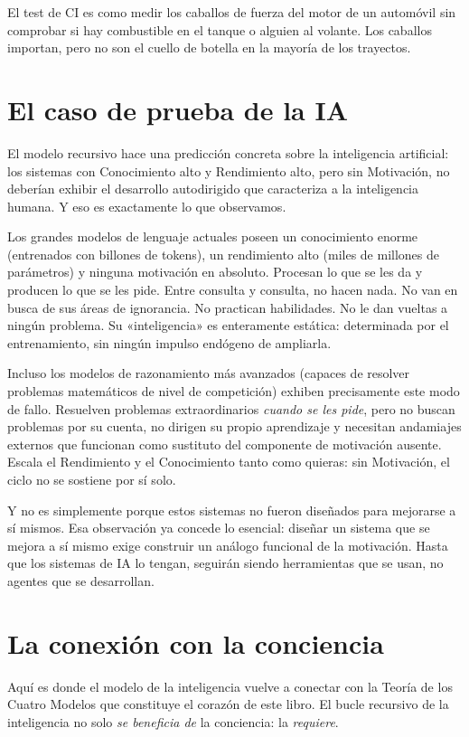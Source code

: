 \documentclass[11pt, twoside, openright]{book}
\begin{document}
El test de CI es como medir los caballos de fuerza del motor de un automóvil sin comprobar si hay combustible en el tanque o alguien al volante. Los caballos importan, pero no son el cuello de botella en la mayoría de los trayectos.

\section*{El caso de prueba de la IA}

El modelo recursivo hace una predicción concreta sobre la inteligencia artificial: los sistemas con Conocimiento alto y Rendimiento alto, pero sin Motivación, no deberían exhibir el desarrollo autodirigido que caracteriza a la inteligencia humana. Y eso es exactamente lo que observamos.

Los grandes modelos de lenguaje actuales poseen un conocimiento enorme (entrenados con billones de tokens), un rendimiento alto (miles de millones de parámetros) y ninguna motivación en absoluto. Procesan lo que se les da y producen lo que se les pide. Entre consulta y consulta, no hacen nada. No van en busca de sus áreas de ignorancia. No practican habilidades. No le dan vueltas a ningún problema. Su «inteligencia» es enteramente estática: determinada por el entrenamiento, sin ningún impulso endógeno de ampliarla.

Incluso los modelos de razonamiento más avanzados (capaces de resolver problemas matemáticos de nivel de competición) exhiben precisamente este modo de fallo. Resuelven problemas extraordinarios \textit{cuando se les pide}, pero no buscan problemas por su cuenta, no dirigen su propio aprendizaje y necesitan andamiajes externos que funcionan como sustituto del componente de motivación ausente. Escala el Rendimiento y el Conocimiento tanto como quieras: sin Motivación, el ciclo no se sostiene por sí solo.

Y no es simplemente porque estos sistemas no fueron diseñados para mejorarse a sí mismos. Esa observación ya concede lo esencial: diseñar un sistema que se mejora a sí mismo exige construir un análogo funcional de la motivación. Hasta que los sistemas de IA lo tengan, seguirán siendo herramientas que se usan, no agentes que se desarrollan.

\section*{La conexión con la conciencia}

Aquí es donde el modelo de la inteligencia vuelve a conectar con la Teoría de los Cuatro Modelos que constituye el corazón de este libro. El bucle recursivo de la inteligencia no solo \textit{se beneficia de} la conciencia: la \textit{requiere}.
\end{document}
